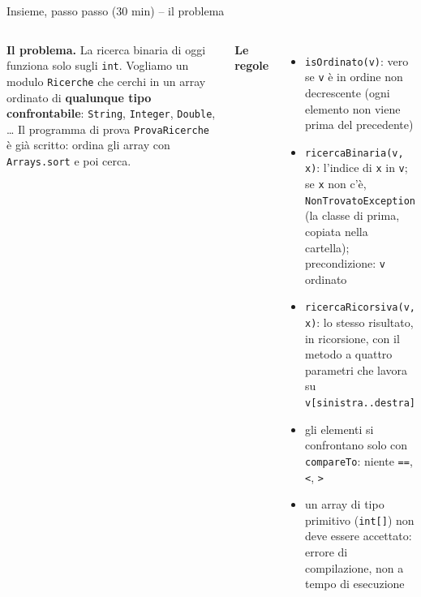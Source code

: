 \documentclass[10pt,aspectratio=169,xcolor={table}]{beamer}
\begin{document}
\begin{frame}[fragile]{Insieme, passo passo (30 min) -- il problema}
\begin{columns}[T]
\footnotesize
\textbf{Il problema.} La ricerca binaria di oggi funziona solo sugli \texttt{int}. Vogliamo un modulo \texttt{Ricerche} che cerchi in un array ordinato di \textbf{qualunque tipo confrontabile}: \texttt{String}, \texttt{Integer}, \texttt{Double}, \ldots{} Il programma di prova \texttt{ProvaRicerche} è già scritto: ordina gli array con \texttt{Arrays.sort} e poi cerca.

\vspace{0.1cm}
\textbf{Le regole}
\begin{itemize}\itemsep=2pt
    \item \texttt{isOrdinato(v)}: vero se \texttt{v} è in ordine non decrescente (ogni elemento non viene prima del precedente)
    \item \texttt{ricercaBinaria(v, x)}: l'indice di \texttt{x} in \texttt{v}; se \texttt{x} non c'è, \texttt{NonTrovatoException} (la classe di prima, copiata nella cartella); precondizione: \texttt{v} ordinato
    \item \texttt{ricercaRicorsiva(v, x)}: lo stesso risultato, in ricorsione, con il metodo a quattro parametri che lavora su \texttt{v[sinistra..destra]}
    \item gli elementi si confrontano solo con \texttt{compareTo}: niente \texttt{==}, \texttt{<}, \texttt{>}
    \item un array di tipo primitivo (\texttt{int[]}) non deve essere accettato: errore di compilazione, non a tempo di esecuzione
\end{itemize}

\end{columns}
\end{frame}
\end{document}
